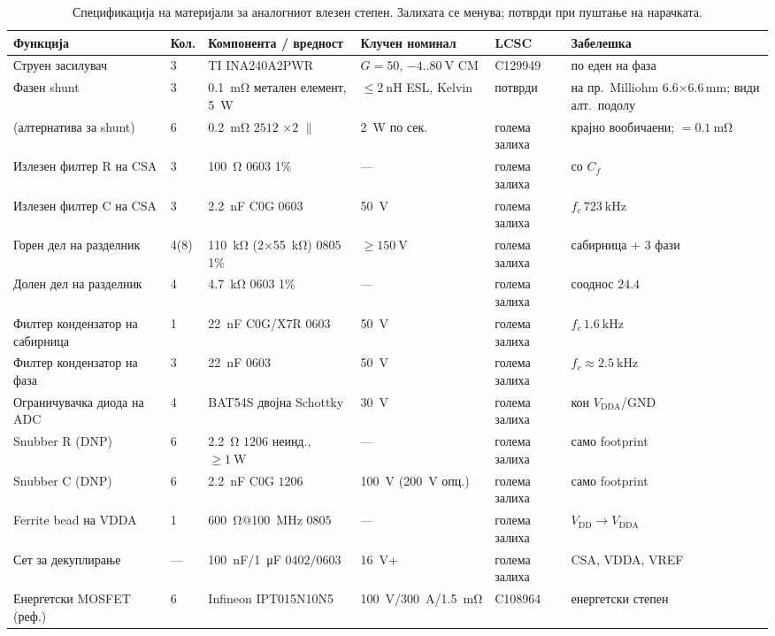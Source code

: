 \documentclass[journal,onecolumn,11pt]{IEEEtran}
\begin{document}
\begin{table}[t]
\centering
\caption{Спецификација на материјали за аналогниот влезен степен. Залихата се менува; потврди при пуштање на нарачката.}
\label{tab:bom}
\small
\renewcommand{\arraystretch}{1.2}
\begin{tabular}{p{3.1cm} p{1.0cm} p{3.2cm} p{2.6cm} p{2.0cm} p{2.7cm}}
\toprule
\textbf{Функција} & \textbf{Кол.} & \textbf{Компонента / вредност} & \textbf{Клучен номинал} & \textbf{LCSC} & \textbf{Забелешка}\\
\midrule
Струен засилувач & 3 & TI INA240A2PWR & $G{=}50$, $-4..\SI{80}{\volt}$ CM & C129949 & по еден на фаза~\cite{lcsc_ina}\\
Фазен shunt & 3 & \SI{0.1}{\milli\ohm} метален елемент, \SI{5}{\watt} & $\le\SI{2}{\nano\henry}$ ESL, Kelvin & потврди & на пр.\ Milliohm 6.6$\times$6.6\,mm; види алт.\ подолу~\cite{lcsc_shunt}\\
\;\;(алтернатива за shunt) & 6 & \SI{0.2}{\milli\ohm} \(2512\) $\times2$ \(\parallel\) & \SI{2}{\watt} по сек. & голема залиха & крајно вообичаени; $=\SI{0.1}{\milli\ohm}$\\
Излезен филтер R на CSA & 3 & \SI{100}{\ohm} \(0603\) 1\% & --- & голема залиха & со $C_f$\\
Излезен филтер C на CSA & 3 & \SI{2.2}{\nano\farad} C0G \(0603\) & \SI{50}{\volt} & голема залиха & $f_c\,\SI{723}{\kilo\hertz}$\\
Горен дел на разделник & 4(8) & \SI{110}{\kilo\ohm} (2$\times$\SI{55}{\kilo\ohm}) \(0805\) 1\% & $\ge\SI{150}{\volt}$ & голема залиха & сабирница + 3 фази\\
Долен дел на разделник & 4 & \SI{4.7}{\kilo\ohm} \(0603\) 1\% & --- & голема залиха & сооднос $24.4$\\
Филтер кондензатор на сабирница & 1 & \SI{22}{\nano\farad} C0G/X7R \(0603\) & \SI{50}{\volt} & голема залиха & $f_c\,\SI{1.6}{\kilo\hertz}$\\
Филтер кондензатор на фаза & 3 & \SI{22}{\nano\farad} \(0603\) & \SI{50}{\volt} & голема залиха & $f_c\approx\SI{2.5}{\kilo\hertz}$\\
Ограничувачка диода на ADC & 4 & BAT54S двојна Schottky & \SI{30}{\volt} & голема залиха & кон $V_{\mathrm{DDA}}$/GND\\
Snubber R (DNP) & 6 & \SI{2.2}{\ohm} \(1206\) неинд., $\ge\SI{1}{\watt}$ & --- & голема залиха & само footprint\\
Snubber C (DNP) & 6 & \SI{2.2}{\nano\farad} C0G \(1206\) & \SI{100}{\volt} (\SI{200}{\volt} опц.) & голема залиха & само footprint\\
Ferrite bead на VDDA & 1 & \SI{600}{\ohm}@\SI{100}{\mega\hertz} \(0805\) & --- & голема залиха & $V_{\mathrm{DD}}\!\to\!V_{\mathrm{DDA}}$\\
Сет за декуплирање & --- & \SI{100}{\nano\farad}/\SI{1}{\micro\farad} \(0402/0603\) & \SI{16}{\volt}+ & голема залиха & CSA, VDDA, VREF\\
Енергетски MOSFET (реф.) & 6 & Infineon IPT015N10N5 & \SI{100}{\volt}/\SI{300}{\ampere}/\SI{1.5}{\milli\ohm} & C108964 & енергетски степен~\cite{lcsc_ipt}\\
\bottomrule
\end{tabular}
\end{table}
\end{document}
